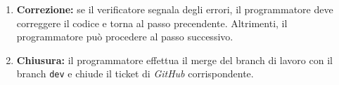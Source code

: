 \begin{itemize}
\begin{enumerate}
		      \item \textbf{Correzione:} se il verificatore segnala degli
		            errori, il programmatore deve correggere il codice e torna
		            al passo precendente. Altrimenti, il programmatore può
		            procedere al passo successivo.

		      \item \textbf{Chiusura:} il programmatore effettua il merge del
		            branch di lavoro con il branch \texttt{dev} e chiude il
		            ticket di \textit{GitHub} corrispondente.
	      \end{enumerate}
\end{itemize}
